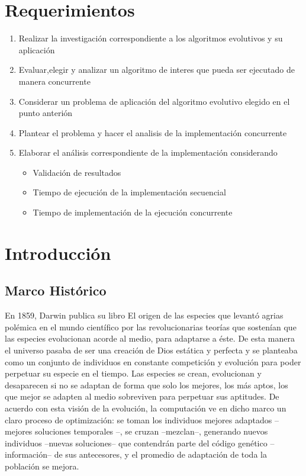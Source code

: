 \documentclass{article}
\begin{document}
\section{Requerimientos}
\begin{enumerate}
    \item{Realizar la investigación correspondiente a los algoritmos evolutivos y su aplicación}
    \item{Evaluar,elegir y analizar un algoritmo de interes que pueda ser ejecutado de manera concurrente}
    \item{Considerar un problema de aplicación del algoritmo evolutivo elegido en el punto anterión}
    \item{Plantear el problema y hacer el analisis de la implementación concurrente}
    \item{Elaborar el análisis correspondiente de la implementación considerando
    \begin{itemize}
        \item Validación de resultados
        \item Tiempo de ejecución de la implementación secuencial
        \item Tiempo de implementación de la ejecución concurrente
    \end{itemize}}
   
\end{enumerate}


\section{Introducción}

\subsection*{Marco Hist\'orico}

En 1859, Darwin publica su libro El origen de las especies que levantó agrias
polémica en el mundo científico por las revolucionarias teorías que sostenían que las
especies evolucionan acorde al medio, para adaptarse a éste.
De esta manera el universo pasaba de ser una creación de Dios estática y perfecta y
se planteaba como un conjunto de individuos en constante competición y evolución para
poder perpetuar su especie en el tiempo. Las especies se crean, evolucionan y
desaparecen si no se adaptan de forma que solo los mejores, los más aptos, los que
mejor se adapten al medio sobreviven para perpetuar sus aptitudes. 
De acuerdo con esta visión de la evolución, la computación ve en dicho marco un
claro proceso de optimización: se toman los individuos mejores adaptados –mejores
soluciones temporales –, se cruzan –mezclan–, generando nuevos individuos –nuevas
soluciones– que contendrán parte del código genético –información– de sus antecesores,
y el promedio de adaptación de toda la población se mejora.
\end{document}
